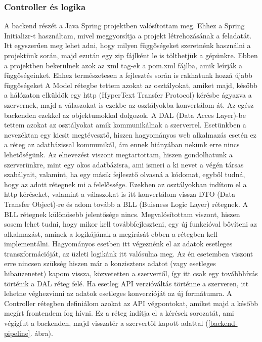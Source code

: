 \documentclass[a4paper,twoside]{article}
\begin{document}
\subsubsection{Controller és logika}
A backend részét a Java Spring projektben valósítottam meg. Ehhez a Spring Initializr-t használtam, mivel meggyorsítja a projekt létrehozásának a feladatát. Itt
egyszerűen meg lehet adni, hogy milyen függőségeket szeretnénk használni a projektünk során, majd ezután egy zip fájlként le is tölthetjük a gépünkre. Ebben a projektben bekerülnek azok az xml tag-ek a pom.xml fájlba, amik leírják a függőségeinket. Ehhez természetesen a fejlesztés során is rakhatunk hozzá újabb függőségeket
A Model rétegbe tettem azokat az osztályokat, amiket majd, később a hálózaton elküldök egy
http (HyperText Transfer Protocol) kérésbe ágyazva a szervernek, majd a válaszokat is ezekbe
az osztályokba konvertálom át. Az egész backenden ezekkel az objektumokkal dolgozok.
A DAL (Data Acces Layer)-be tettem azokat az osztályokat amik kommunikálnak a
szerverrel. Esetünkben a nevezéktan egy kicsit megtévesztő, hiszen hagyományos web
alkalmazás esetén ez a réteg az adatbázissal kommunikál, ám ennek hiányában nekünk erre
nincs lehetőségünk. Az elnevezést viszont megtartottam, hiszen gondolhatunk a szerverünkre,
mint egy okos adatbázisra, ami ismeri a ki nevet a végén társas szabályait, valamint, ha egy
másik fejlesztő olvasná a kódomat, egyből tudná, hogy az adott rétegnek mi a felelőssége.
Ezekben az osztályokban indítom el a http kéréseket, valamint a válaszokat is itt konvertálom
vissza DTO (Data Transfer Object)-re és adom tovább a BLL (Buisness Logic Layer)
rétegnek.
A BLL rétegnek különösebb jelentősége nincs. Megvalósítottam viszont, hiszen sosem lehet
tudni, hogy mikor kell továbbfejleszteni, egy új funkcióval bővíteni az alkalmazást, aminek a
logikájának a megírását ebben a rétegben kell implementálni. Hagyományos esetben itt
végeznénk el az adatok esetleges transzformációját, az üzleti logikánk itt valósulna meg. Az
én esetemben viszont erre nincsen szükség hiszen már a konzisztens adatot (vagy esetleges
hibaüzenetet) kapom vissza, közvetetten a szervertől, így itt csak egy továbbhívás történik a
DAL réteg felé. Ha esetleg API verzióváltás történne a szerveren, itt lehetne véghezvinni az adatok esetleges konverzióját az új formátumra.
A Controller rétegben definiálom azokat az API végpontokat, amiket majd a később megírt
frontendem fog hívni. Ez a réteg indítja el a kérések sorozatát, ami végigfut a backenden,
majd visszatér a szervertől kapott adattal (\ref{backend-pipeline}. ábra).
\end{document}
